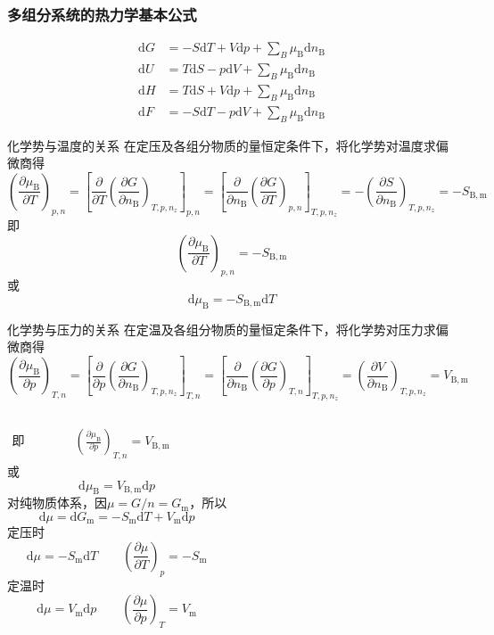 \begin{frame}
    \frametitle{多组分系统的热力学基本公式}
    \[
        \begin{aligned}
            \mathrm{d}G&=-S\mathrm{d}T+V\mathrm{d}p+\sum_B{\mu_\mathrm{B}\mathrm{d}n_\mathrm{B}} \\
            \mathrm{d}U&=T\mathrm{d}S-p\mathrm{d}V+\sum_B{\mu_\mathrm{B}\mathrm{d}n_\mathrm{B}} \\
            \mathrm{d}H&=T\mathrm{d}S+V\mathrm{d}p+\sum_B{\mu_\mathrm{B}\mathrm{d}n_\mathrm{B}} \\
            \mathrm{d}F&=-S\mathrm{d}T-p\mathrm{d}V+\sum_B{\mu_\mathrm{B}\mathrm{d}n_\mathrm{B}} 
        \end{aligned}
    \]
\end{frame}


\begin{frame}{化学势与温度的关系}
    在定压及各组分物质的量恒定条件下，将化学势对温度求偏微商得
    \small  $$\left(\frac{\partial \mu_{\mathrm{B}}}{\partial T}\right)_{p, n}=\left[\frac{\partial}{\partial T}\left(\frac{\partial G}{\partial n_{\mathrm{B}}}\right)_{T, p, n_{z}}\right]_{p, n}=\left[\frac{\partial}{\partial n_{\mathrm{B}}}\left(\frac{\partial G}{\partial T}\right)_{p, n}\right]_{T, p, n_{z}}=-\left(\frac{\partial S}{\partial n_{\mathrm{B}}}\right)_{T, p, n_{z}}=-S_{\mathrm{B}, \mathrm{m}}$$
    即
    $$\left(\frac{\partial \mu_{\mathrm{B}}}{\partial T}\right)_{p, n}=-S_{\mathrm{B,m}}$$
    或
    $$\mathrm{d}\mu_\mathrm{B}=-S_{\mathrm{B,m}}\mathrm{d}T$$
\end{frame}


\begin{frame}{化学势与压力的关系}
    在定温及各组分物质的量恒定条件下，将化学势对压力求偏微商得
    \small  $$\left(\frac{\partial \mu_{\mathrm{B}}}{\partial p}\right)_{T, n}=\left[\frac{\partial}{\partial p}\left(\frac{\partial G}{\partial n_{\mathrm{B}}}\right)_{T, p, n_{z}}\right]_{T, n}=\left[\frac{\partial}{\partial n_{\mathrm{B}}}\left(\frac{\partial G}{\partial p}\right)_{T, n}\right]_{T, p, n_{z}}=\left(\frac{\partial V}{\partial n_{\mathrm{B}}}\right)_{T, p, n_{z}}=V_{\mathrm{B}, \mathrm{m}}$$    
    \begin{columns}
        \column{6.75cm}
        $\begin{aligned}
            \text{即}\qquad\qquad\left(\frac{\partial \mu_{\mathrm{B}}}{\partial p}\right)_{T, n}=V_{\mathrm{B,m}}           
        \end{aligned}$ 
        \\或$$\mathrm{d}\mu_\mathrm{B}=V_{\mathrm{B,m}}\mathrm{d}p$$
        对纯物质体系，因$\mu =G/n=G_\mathrm{m}$，所以
        $$\mathrm{d}\mu = \mathrm{d} G_\mathrm{m} = -S_\mathrm{m}\mathrm{d}T+V_\mathrm{m}\mathrm{d}p$$
        \column{6.75cm}
            定压时
            $$\mathrm{d} \mu=-S_{\mathrm{m}} \mathrm{d} T \qquad\left(\frac{\partial \mu}{\partial T}\right)_{p}=-S_{\mathrm{m}}$$
            定温时
            $$\mathrm{d} \mu=V_{\mathrm{m}} \mathrm{d} p \qquad\left(\frac{\partial \mu}{\partial p}\right)_{T}=V_{\mathrm{m}}$$
    \end{columns}
\end{frame}


